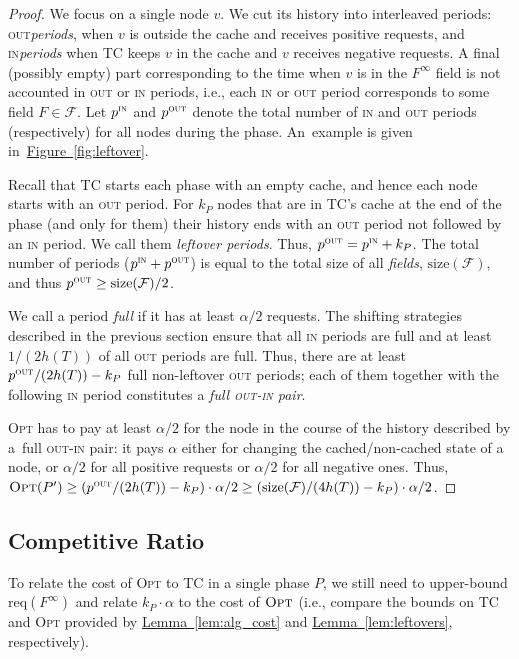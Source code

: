 \documentclass[sigconf,screen=true]{acmart}
\newcommand{\lref}[2][]{\hyperref[#2]{#1~\ref*{#2}}}
\newcommand{\ALG}{\textsc{TC}\xspace}
\newcommand{\OPT}{\textsc{Opt}\xspace}
\newcommand{\size}{\textrm{size}}
\newcommand{\req}{\textrm{req}}
\newcommand{\F}{\mathcal{F}}
\newcommand{\pin}{\textnormal{\textsc{in}}\xspace}
\newcommand{\pout}{\textnormal{\textsc{out}}\xspace}
\begin{document}
\begin{proof}
We focus on a single node $v$.  We cut its history into interleaved periods:
\pout \emph{periods}, when $v$ is outside the cache and receives positive 
requests, and \pin \emph{periods} when \ALG keeps $v$ in the cache and $v$
receives negative requests. A final (possibly empty) part corresponding to the
time when $v$ is in the $F^\infty$ field is not accounted in \pout or \pin
periods, i.e., each \pin or \pout period corresponds to some field $F \in \F$.
Let $p^\pin$ and $p^\pout$ denote the total number of \pin and \pout periods
(respectively) for all nodes during the phase. An~example is given
in~\lref[Figure]{fig:leftover}.

Recall that \ALG starts each phase with an empty cache, and hence each node
starts with an \pout period. For $k_P$ nodes that are in {\ALG}'s cache at the
end of the phase (and only for them) their history ends with an \pout period
not followed by an \pin period. We call them \emph{leftover periods}. Thus,
$p^\pout = p^\pin + k_P$. The total number of periods ($p^\pin + p^\pout$) is
equal to the total size of all \emph{fields}, $\size(\F)$, and thus $p^\pout 
\geq \size(\F) / 2$.

We call a period \emph{full} if it has at least $\alpha/2$ requests. The
shifting strategies described in the previous section ensure that all
\pin periods are full and at least $1/(2 h(T))$ of all \pout periods are full.
Thus, there are at least $p^\pout/(2 h(T)) - k_P$ full non-leftover \pout
periods; each of them together with the following \pin period constitutes a
\emph{full \pout-\pin pair}.

\OPT has to pay at least $\alpha/2$ for the node in the course of the history
described by a~full \pout-\pin pair: it pays $\alpha$ either for changing the
cached/non-cached state of a node, or $\alpha/2$ for all positive requests or
$\alpha/2$ for all negative ones. Thus, $\OPT(P') \geq ( p^\pout / (2 h(T)) -
k_P ) \cdot \alpha/2 \geq ( \size(\F) / (4 h(T)) - k_P ) \cdot \alpha/2$.
\end{proof}



\subsection{Competitive Ratio}
\label{sec:comp_ratio}

To relate the cost of \OPT to \ALG in a single phase $P$, we still need to
upper-bound $\req (F^\infty)$ and relate $k_P \cdot \alpha$ to the cost of
$\OPT$ (i.e., compare the bounds on \ALG and \OPT provided by
\lref[Lemma]{lem:alg_cost} and \lref[Lemma]{lem:leftovers}, respectively).
\end{document}
